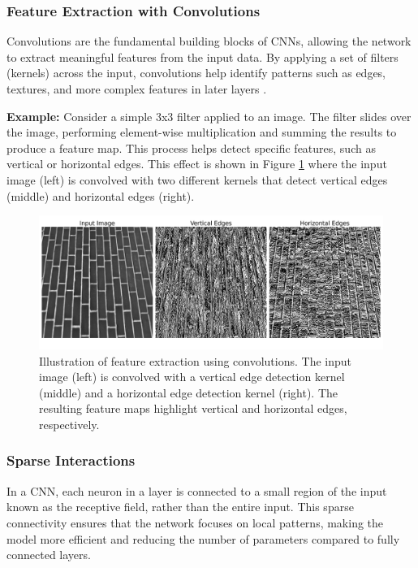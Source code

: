 \documentclass[english,11pt,a4paper,titlepage]{article}
\begin{document}
	\subsubsection*{Feature Extraction with Convolutions}
	Convolutions are the fundamental building blocks of CNNs, allowing the network to extract meaningful features from the input data. By applying a set of filters (kernels) across the input, convolutions help identify patterns such as edges, textures, and more complex features in later layers \cite{osheaIntroductionConvolutionalNeural2015}.
	
	\textbf{Example:} Consider a simple 3x3 filter applied to an image. The filter slides over the image, performing element-wise multiplication and summing the results to produce a feature map. This process helps detect specific features, such as vertical or horizontal edges. This effect is shown in Figure \ref{fig:nn_featureextraction} where the input image (left) is convolved with two different kernels that detect vertical edges (middle) and horizontal edges (right).
	
	\begin{figure}[h]
		\centering
		\includegraphics[width=0.9\linewidth]{img/kernels.png}
		\caption{Illustration of feature extraction using convolutions. The input image (left) is convolved with a vertical edge detection kernel (middle) and a horizontal edge detection kernel (right). The resulting feature maps highlight vertical and horizontal edges, respectively.}
		\label{fig:nn_featureextraction}
	\end{figure}
	
	\subsubsection*{Sparse Interactions}
	In a CNN, each neuron in a layer is connected to a small region of the input known as the receptive field, rather than the entire input. This sparse connectivity ensures that the network focuses on local patterns, making the model more efficient and reducing the number of parameters compared to fully connected layers.
	
\end{document}

